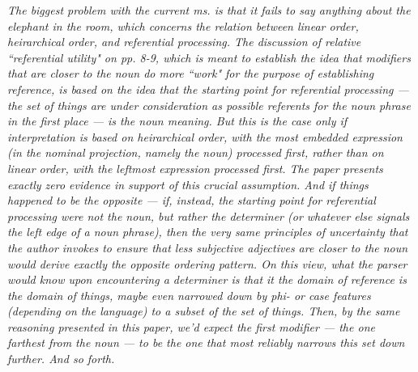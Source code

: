 \documentclass[12pt]{article}
\begin{document}
\item \emph{The biggest problem with the current ms. is that it fails to say anything
about the elephant in the room, which concerns the relation between linear
order, heirarchical order, and referential processing.  The discussion of
relative ``referential utility" on pp. 8-9, which is meant to establish the
idea that modifiers that are closer to the noun do more ``work" for the
purpose of establishing reference, is based on the idea that the starting
point for referential processing --- the set of things are under
consideration as possible referents for the noun phrase in the first place
--- is the noun meaning. But this is the case only if interpretation is
based on heirarchical order, with the most embedded expression (in the
nominal projection, namely the noun) processed first, rather than on linear
order, with the leftmost expression processed first.  The paper presents
exactly zero evidence in support of this crucial assumption.  And if things
happened to be the opposite --- if, instead, the starting point for
referential processing were not the noun, but rather the determiner (or
whatever else signals the left edge of a noun phrase), then the very same
principles of uncertainty that the author invokes to ensure that less
subjective adjectives are closer to the noun would derive exactly the
opposite ordering pattern. On this view, what the parser would know upon
encountering a determiner is that it the domain of reference is the domain
of things, maybe even narrowed down by phi- or case features (depending on
the language) to a subset of the set of things.  Then, by the same reasoning
presented in this paper, we'd expect the first modifier --- the one farthest
from the noun --- to be the one that most reliably narrows this set down
further.  And so forth.}
\end{document}
